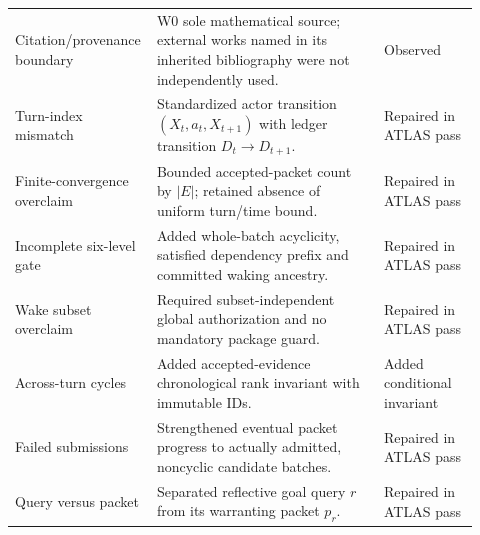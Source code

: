 \documentclass[11pt,letterpaper]{article}
\begin{document}
\begin{longtable}{>{\raggedright\arraybackslash}p{0.24\linewidth}>{\raggedright\arraybackslash}p{0.48\linewidth}>{\raggedright\arraybackslash}p{0.20\linewidth}}
Citation/provenance boundary & W0 sole mathematical source; external works named in its inherited bibliography were not independently used. & Observed\\
Turn-index mismatch & Standardized actor transition $(X_t,a_t,X_{t+1})$ with ledger transition $D_t\to D_{t+1}$. & Repaired in ATLAS pass\\
Finite-convergence overclaim & Bounded accepted-packet count by $|E|$; retained absence of uniform turn/time bound. & Repaired in ATLAS pass\\
Incomplete six-level gate & Added whole-batch acyclicity, satisfied dependency prefix and committed waking ancestry. & Repaired in ATLAS pass\\
Wake subset overclaim & Required subset-independent global authorization and no mandatory package guard. & Repaired in ATLAS pass\\
Across-turn cycles & Added accepted-evidence chronological rank invariant with immutable IDs. & Added conditional invariant\\
Failed submissions & Strengthened eventual packet progress to actually admitted, noncyclic candidate batches. & Repaired in ATLAS pass\\
Query versus packet & Separated reflective goal query $r$ from its warranting packet $p_r$. & Repaired in ATLAS pass\\\bottomrule
\end{longtable}
\endgroup
\end{document}
